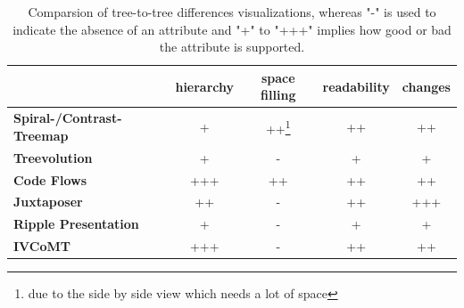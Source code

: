 


\begin{table}[tb]
\centering 
\begin{tabular}[r]{|l|c|c|c|c|} 
\hline
& \textbf{hierarchy} & \textbf{space filling} & \textbf{readability} & \textbf{changes}\\
\hline
\hline
\textbf{Spiral-/Contrast-Treemap} & + & ++\footnote{due to the side by side view which needs a lot of space} & ++ & ++\\
\hline
\textbf{Treevolution} & + & - & + & +\\
\hline
\textbf{Code Flows} & +++ & ++ & ++ & ++\\
\hline
\textbf{Juxtaposer} & ++ & - & ++ & +++\\
\hline
\textbf{Ripple Presentation} & + & - & + & +\\
\hline
\textbf{IVCoMT} & +++ & - & ++ & ++ \\
\hline
\end{tabular}
\label{chap2:comparsion}
\vspace{0.5em} 
\caption{Comparsion of tree-to-tree differences visualizations, whereas "-" is used to indicate the absence of an attribute and "+" to "+++" implies how good or bad the attribute is supported.}
\end{table}






